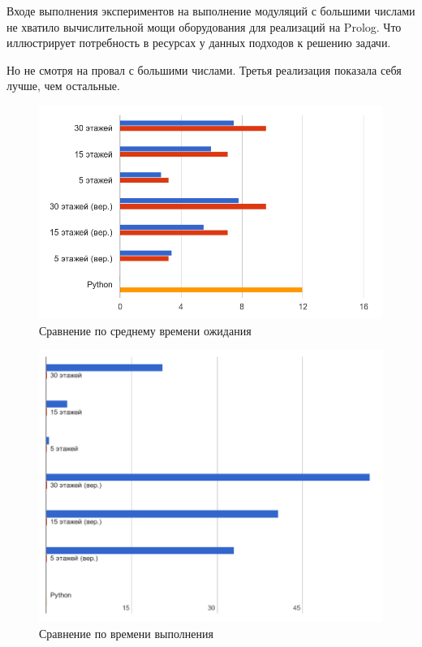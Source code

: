 		Входе выполнения экспериментов на выполнение модуляций с большими числами не хватило вычислительной мощи
		оборудования для реализаций на Prolog. Что иллюстрирует потребность в ресурсах у данных подходов
		к решению задачи.

		Но не смотря на провал с большими числами. Третья реализация показала себя лучше, чем остальные.








		\begin{figure}[h]
			\centering
			\includegraphics[width=180mm]{src/pictures/projectp1.png}
			\caption{Сравнение по среднему времени ожидания}\label{pt1}
		\end{figure}

		\begin{figure}[h]
			\centering
			\includegraphics[width=180mm]{src/pictures/projectp2.png}
			\caption{Сравнение по времени выполнения}\label{pt2}
		\end{figure}
